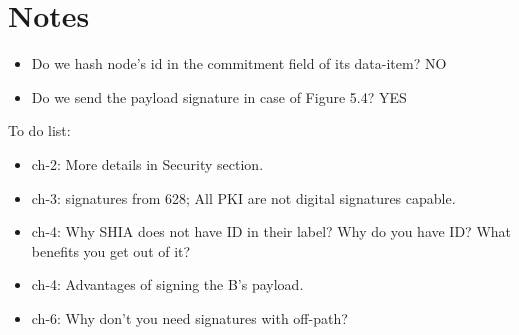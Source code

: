 \chapter{Notes}

\begin{itemize}
	\item Do we hash node's id in the commitment field of its data-item? NO
	\item Do we send the payload signature in case of Figure 5.4? YES
\end{itemize}

To do list:
\begin{itemize}
	\item ch-2: More details in Security section.
	\item ch-3: signatures from 628; All PKI are not digital signatures capable.
	\item ch-4: Why SHIA does not have ID in their label? Why do you have ID? What benefits you get out of it?
	\item ch-4: Advantages of signing the B's payload.
	\item ch-6: Why don't you need signatures with off-path?

\end{itemize}